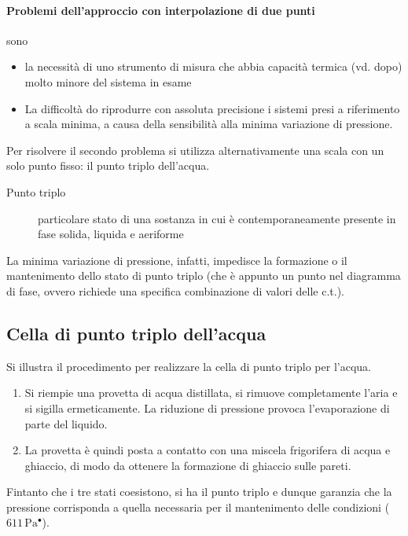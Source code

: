 \documentclass[10pt, oneside]{book}
\newcommand{\pascal}[1]{\, \mathrm{Pa^{#1}}}
\begin{document}
\paragraph{Problemi dell'approccio con interpolazione di due punti} sono 
\begin{itemize}
\item la necessità di uno strumento di misura che abbia capacità termica (vd. dopo) molto minore del sistema in esame
\item La difficoltà do riprodurre con assoluta precisione i sistemi presi a riferimento a scala minima, a causa della sensibilità alla minima variazione di pressione.
\end{itemize}
Per risolvere il secondo problema si utilizza alternativamente una scala con un solo punto fisso: il punto triplo dell'acqua.
\begin{description}
\item[Punto triplo] particolare stato di una sostanza in cui è contemporaneamente presente in fase solida, liquida e aeriforme
\end{description}
La minima variazione di pressione, infatti, impedisce la formazione o il mantenimento dello stato di punto triplo (che è appunto un punto nel diagramma di fase, ovvero richiede una specifica combinazione di valori delle c.t.).

\subsection{Cella di punto triplo dell'acqua}
Si illustra il procedimento per realizzare la cella di punto triplo per l'acqua.\\
\begin{enumerate}
\item Si riempie una provetta di acqua distillata, si rimuove completamente l'aria e si sigilla ermeticamente. La riduzione di pressione provoca l'evaporazione di parte del liquido.
\item La provetta è quindi posta a contatto con una miscela frigorifera di acqua e ghiaccio, di modo da ottenere la formazione di ghiaccio sulle pareti.
\end{enumerate}
Fintanto che i tre stati coesistono, si ha il punto triplo e dunque garanzia che la pressione corrisponda a quella necessaria per il mantenimento delle condizioni ($611 \pascal{•}$).
\end{document}
